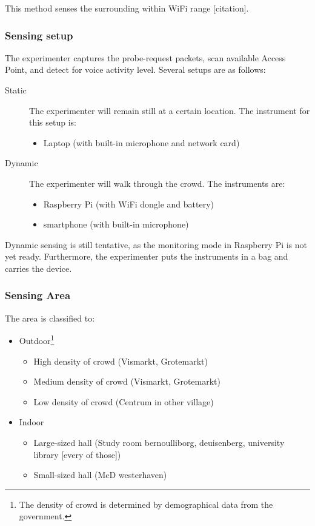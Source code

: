 \documentclass{article}
\begin{document}
This method senses the surrounding within WiFi range [citation].

\subsubsection*{Sensing setup} %
The experimenter captures the probe-request packets, scan available Access Point, and detect for voice activity level. Several setups are as follows:

\label{ssub:sensing_setup}
\begin{description}
	\item[Static] The experimenter will remain still at a certain location. The instrument for this setup is:
	\begin{itemize}
		\item Laptop (with built-in microphone and network card)
	\end{itemize}

	\item[Dynamic] The experimenter will walk through the crowd. The instruments are:
	\begin{itemize}
		\item Raspberry Pi (with WiFi dongle and battery)
		\item smartphone (with built-in microphone)
	\end{itemize}
\end{description}

Dynamic sensing is still tentative, as the monitoring mode in Raspberry Pi is not yet ready. Furthermore, the experimenter puts the instruments in a bag and carries the device.

\subsubsection*{Sensing Area} %
\label{ssub:sensing_area}
The area is classified to:
\begin{itemize}
	\item Outdoor\footnote{The density of crowd is determined by demographical data from the government.}
	\begin{itemize}
		\item High density of crowd (Vismarkt, Grotemarkt)
		\item Medium density of crowd (Vismarkt, Grotemarkt)
		\item Low density of crowd (Centrum in other village)
	\end{itemize}
	
	\item Indoor
	\begin{itemize}
		\item Large-sized hall (Study room bernoulliborg, deuisenberg, university library [every of those])
		\item Small-sized hall (McD westerhaven)
	\end{itemize}
\end{itemize}
\end{document}
